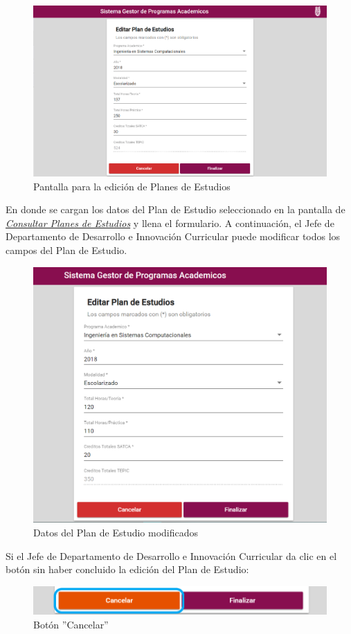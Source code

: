 \begin{figure}[!hbtp]
	\centering
	\hypertarget{editarPE}{\includegraphics[width=0.7\linewidth]{images/SP4-GPE/editarPE}}
	\caption{Pantalla para la edición de Planes de Estudios}
	\label{editarPE}
\end{figure}

En donde se cargan los datos del Plan de Estudio seleccionado en la pantalla de \hyperlink{consultarPE}{\textit{Consultar Planes de Estudios}} y llena el formulario.
\newpage
A continuación, el Jefe de Departamento de Desarrollo e Innovación Curricular puede modificar todos los campos del Plan de Estudio.
\begin{figure}[!hbtp]
	\centering
	\hypertarget{modif}{\includegraphics[width=0.7\linewidth]{images/SP4-GPE/editarPE1}}
	\caption{Datos del Plan de Estudio modificados}
	\label{modif}
\end{figure}

 Si el Jefe de Departamento de Desarrollo e Innovación Curricular da clic en el botón  sin haber concluido la edición del Plan de Estudio:

\begin{figure}[!hbtp]
	\centering
	\hypertarget{cancel2}{\includegraphics[width=0.7\linewidth]{images/SP4-GPE/cancelarPE}}
	\caption{Botón ''Cancelar''}
	\label{cancel2}
\end{figure}
\newpage

